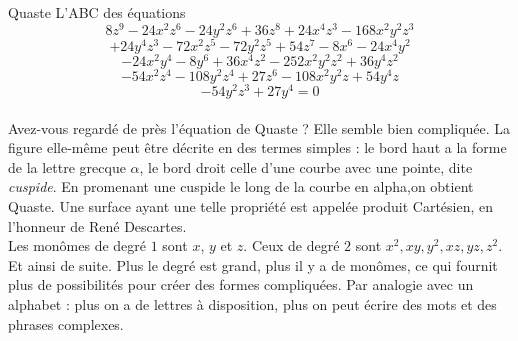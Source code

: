 \begin{surferPage}{Quaste}
L'ABC des équations
  \smallskip
\[8z^9-24x^2z^6-24y^2z^6+36z^8+24x^4z^3-168x^2y^2z^3\]
\[+24y^4z^3-72x^2z^5-72y^2z^5+54z^7-8x^6-24x^4y^2\]
\[-24x^2y^4-8y^6 + 36x^4z^2-252x^2y^2z^2+36y^4z^2\]
\[- 54x^2z^4-108y^2z^4 + 27z^6-108x^2y^2z + 54y^4z\]
\[-54y^2z^3 + 27y^4 = 0\]\\
\vspace{0.3cm}
Avez-vous regardé de près l'équation de Quaste ? Elle semble bien compliquée.
La figure elle-même peut être décrite en des termes simples : le bord haut a la forme de la lettre grecque $\alpha$, le bord droit celle d'une courbe avec une pointe, dite {\it cuspide}. En promenant une cuspide le long de la courbe en alpha,on obtient Quaste. Une surface ayant une telle propriété est appelée produit Cartésien, en l'honneur de René Descartes.\\
\vspace{0.3cm}
Les monômes de degré $1$ sont $x$, $y$ et $z$. Ceux de degré $2$ sont $x^2, xy, y^2, xz, yz, z^2$. Et ainsi de suite. Plus le degré est grand, plus il y a de monômes, ce qui fournit plus de possibilités pour créer des formes compliquées. Par analogie avec un alphabet : plus on a de lettres à disposition, plus on peut écrire des mots et des phrases complexes.
\end{surferPage}
